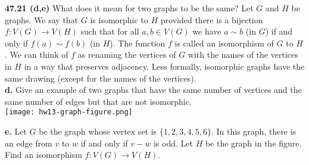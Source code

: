 \documentclass[10pt]{article}
\begin{document}
\begin{framed}
	\textbf{47.21 (d,e)} What does it mean for two graphs to be the same? Let $G$ and $H$ be graphs. 
	We say that $G$ is isomorphic to $H$ provided there is a bijection $f: V(G) \rightarrow V(H)$ 
	such that for all $a, b \in V(G)$ we have $a \sim b$ (in $G$) if and only if $f(a) \sim f(b)$ (in $H$). 
	The function $f$ is called an isomorphism of $G$ to $H$.
	We can think of $f$ as renaming the vertices of $G$ with the names of the vertices in $H$ in a way that 
	preserves adjacency. Less formally, isomorphic graphs have the same drawing (except for the names of 
	the vertices).\\

	\textbf{d.} Give an example of two graphs that have the same number of vertices and the same number of 
	edges but that are not isomorphic.\\

	\texttt{[image: hw13-graph-figure.png]}

	\textbf{e.} Let $G$ be the graph whose vertex set is $\{1, 2, 3, 4, 5, 6\}$. In this graph, there 
	is an edge from $v$ to $w$ if and only if $v-w$ is odd. Let $H$ be the graph in the figure. 
	Find an isomorphism $f: V(G) \rightarrow V(H)$.
\end{framed}
\end{document}
